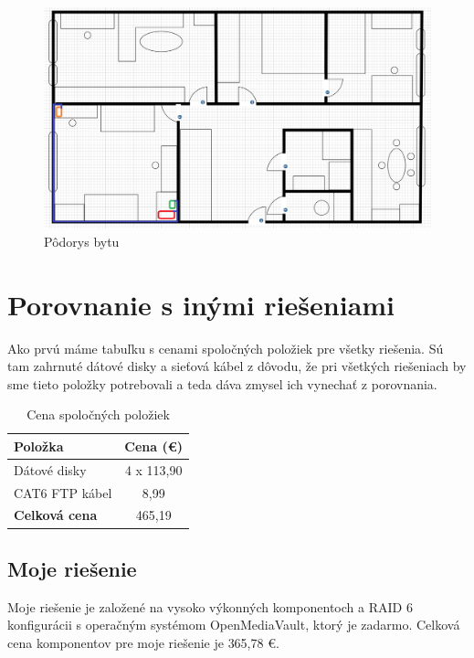 \documentclass[12pt,oneside,slovak,a4paper]{article}
\begin{document}
\begin{figure}[H]
	\centering
	\captionsetup{justification=centering,margin=2cm}
	\includegraphics[width=\linewidth]{./images/nakres-bytu.png}
	\centering
	\caption{Pôdorys bytu}
	\label{fig:floorplan}
\end{figure}


\section{Porovnanie s inými riešeniami}
Ako prvú máme tabuľku s cenami spoločných položiek pre všetky riešenia. Sú tam zahrnuté dátové disky a sieťová kábel z dôvodu, že pri všetkých riešeniach by sme tieto položky potrebovali a teda dáva zmysel ich vynechať z porovnania.

\begin{table}[h]
\centering
\begin{tabular}{|l|c|}
\hline
\textbf{Položka} & \textbf{Cena (€)} \\ \hline
Dátové disky & 4 x 113,90 \\ \hline
CAT6 FTP kábel & 8,99 \\ \hline
\textbf{Celková cena} & 465,19\\ \hline
\end{tabular}
\caption{Cena spoločných položiek}
\end{table}

\subsection{Moje riešenie}
Moje riešenie je založené na vysoko výkonných komponentoch a RAID 6 konfigurácii s operačným systémom OpenMediaVault, ktorý je zadarmo. Celková cena komponentov pre moje riešenie je 365,78 €.
\end{document}
